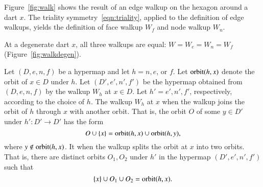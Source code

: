 Figure~\ref{fig:walk} shows
the result of an edge walkup on the hexagon around a dart $x$.
The triality symmetry~\ref{eqn:triality}, applied to the definition
of edge walkups, yields the definition of
face walkup $W_f$ and node walkup $W_n$.  

At a degenerate dart $x$, all three walkups are equal: $W=W_e=W_n=W_f$
(Figure~\ref{fig:walkdegen}).  %
%

\figGFJIBZV  %


\figLNIZBPW %



\begin{definition}\label{def:merge-split} 
Let $(D,e,n,f)$ be a hypermap and
  let $h=n,e$, or $f$.  Let ${\operatorname{orbit}}(h,x)$ denote the orbit of
  $x\in D$ under $h$.  Let $(D',e',n',f')$ be the hypermap obtained
  from $(D,e,n,f)$ by the walkup $W_h$ at $x\in D$.  Let
  $h'=e',n',f'$, respectively, according to the choice of $h$.  The
  walkup $W_h$ at $x$  when the walkup joins the orbit
  of $h$ through $x$ with another orbit.  That is, the orbit $O$ of
  some $y\in D'$ under $h':D'\to D'$ has the form
\[ 
  O \cup\{x\} = {\operatorname{orbit}}(h,x) \cup {\operatorname{orbit}}(h,y),
\] 
where $y\not\in {\operatorname{orbit}}(h,x)$.  It  when the walkup
splits the orbit at $x$ into two orbits.  That is, there are distinct
orbits $O_1,O_2$ under $h'$ in the hypermap $(D',e',n',f')$ such that
\[ 
  \{x\}\cup O_1\cup O_2 = {\operatorname{orbit}}(h,x).
\] 
%
%
%
\end{definition}

